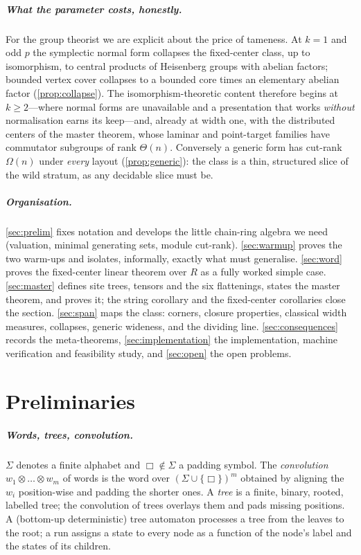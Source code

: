 \documentclass[a4paper,UKenglish,autoref,anonymous]{lipics-v2021}
\newcommand{\R}{R}                                   %
\newcommand{\conv}{\otimes}
\begin{document}
\subparagraph*{What the parameter costs, honestly.}
For the group theorist we are explicit about the price of tameness. At
$k = 1$ and odd $p$ the symplectic normal form collapses the fixed-center
class, up to isomorphism, to central products of Heisenberg groups with
abelian factors; bounded vertex cover collapses to a bounded core times an
elementary abelian factor (\autoref{prop:collapse}). The
isomorphism-theoretic content therefore begins at $k \ge 2$---where
normal forms are unavailable and a presentation that works \emph{without}
normalisation earns its keep---and, already at width one, with the
distributed centers of the master theorem, whose laminar and point-target
families have commutator subgroups of rank $\Theta(n)$. Conversely a
generic form has cut-rank $\Omega(n)$ under \emph{every} layout
(\autoref{prop:generic}): the class is a thin, structured slice of the
wild stratum, as any decidable slice must be.

\subparagraph*{Organisation.}
\autoref{sec:prelim} fixes notation and develops the little chain-ring
algebra we need (valuation, minimal generating sets, module cut-rank).
\autoref{sec:warmup} proves the two warm-ups and isolates, informally,
exactly what must generalise. \autoref{sec:word} proves the fixed-center
linear theorem over $\R$ as a fully worked simple case.
\autoref{sec:master} defines site trees, tensors and the six flattenings,
states the master theorem, and proves it; the string corollary and the
fixed-center corollaries close the section. \autoref{sec:span} maps the
class: corners, closure properties, classical width measures, collapses,
generic wideness, and the dividing line. \autoref{sec:consequences}
records the meta-theorems, \autoref{sec:implementation} the
implementation, machine verification and feasibility study, and
\autoref{sec:open} the open problems.

\section{Preliminaries}
\label{sec:prelim}

\subparagraph*{Words, trees, convolution.}
$\Sigma$ denotes a finite alphabet and $\Box \notin \Sigma$ a padding
symbol. The \emph{convolution} $w_1 \conv \dots \conv w_m$ of words is the
word over $(\Sigma \cup \{\Box\})^m$ obtained by aligning the $w_i$
position-wise and padding the shorter ones. A \emph{tree} is a finite,
binary, rooted, labelled tree; the convolution of trees overlays them and
pads missing positions. A (bottom-up deterministic) tree automaton
processes a tree from the leaves to the root; a run assigns a state to
every node as a function of the node's label and the states of its
children.
\end{document}
